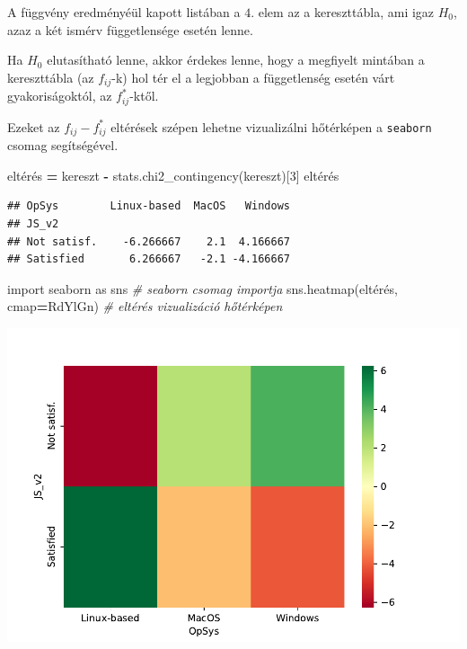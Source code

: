 \documentclass[
]{book}
\newenvironment{Shaded}{\begin{snugshade}}{\end{snugshade}}
\newcommand{\CommentTok}[1]{\textcolor[rgb]{0.56,0.35,0.01}{\textit{#1}}}
\newcommand{\DecValTok}[1]{\textcolor[rgb]{0.00,0.00,0.81}{#1}}
\newcommand{\ImportTok}[1]{#1}
\newcommand{\NormalTok}[1]{#1}
\newcommand{\OperatorTok}[1]{\textcolor[rgb]{0.81,0.36,0.00}{\textbf{#1}}}
\newcommand{\StringTok}[1]{\textcolor[rgb]{0.31,0.60,0.02}{#1}}
\begin{document}
A függvény eredményéül kapott listában a \(4.\) elem az a kereszttábla, ami igaz \(H_0\), azaz a két ismérv függetlensége esetén lenne.

Ha \(H_0\) elutasítható lenne, akkor érdekes lenne, hogy a megfiyelt mintában a kereszttábla (az \(f_{ij}\)-k) hol tér el a legjobban a függetlenség esetén várt gyakoriságoktól, az \(f^*_{ij}\)-ktől.

Ezeket az \(f_{ij}-f^*_{ij}\) eltérések szépen lehetne vizualizálni hőtérképen a \texttt{seaborn} csomag segítségével.

\begin{Shaded}
\begin{Highlighting}[]
\NormalTok{eltérés }\OperatorTok{=}\NormalTok{ kereszt }\OperatorTok{{-}}\NormalTok{ stats.chi2\_contingency(kereszt)[}\DecValTok{3}\NormalTok{]}
\NormalTok{eltérés}
\end{Highlighting}
\end{Shaded}

\begin{verbatim}
## OpSys        Linux-based  MacOS   Windows
## JS_v2                                    
## Not satisf.    -6.266667    2.1  4.166667
## Satisfied       6.266667   -2.1 -4.166667
\end{verbatim}

\begin{Shaded}
\begin{Highlighting}[]

\ImportTok{import}\NormalTok{ seaborn }\ImportTok{as}\NormalTok{ sns }\CommentTok{\# seaborn csomag importja}
\NormalTok{sns.heatmap(eltérés, cmap}\OperatorTok{=}\StringTok{\textquotesingle{}RdYlGn\textquotesingle{}}\NormalTok{) }\CommentTok{\# eltérés vizualizáció hőtérképen}
\end{Highlighting}
\end{Shaded}

\includegraphics{_main_files/figure-latex/unnamed-chunk-380-35.pdf}
\end{document}
